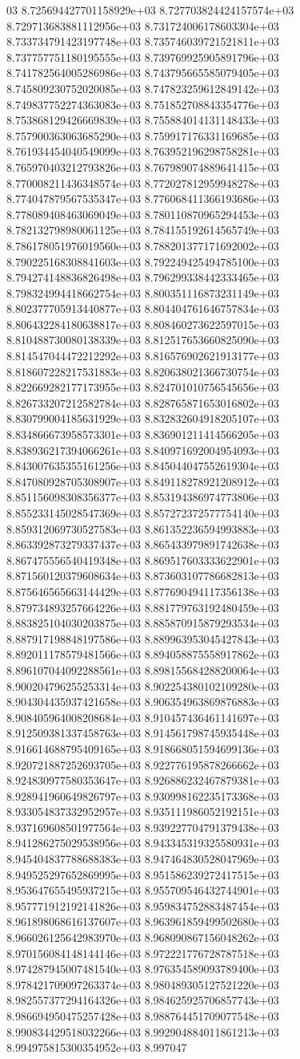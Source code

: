03	8.725694427701158929e+03	8.727703824424157574e+03	8.729713683881112956e+03	8.731724006178603304e+03	8.733734791423197748e+03	8.735746039721521811e+03	8.737757751180195555e+03	8.739769925905891796e+03	8.741782564005286986e+03	8.743795665585079405e+03	8.745809230752020085e+03	8.747823259612849142e+03	8.749837752274363083e+03	8.751852708843354776e+03	8.753868129426669839e+03	8.755884014131148433e+03	8.757900363063685290e+03	8.759917176331169685e+03	8.761934454040549099e+03	8.763952196298758281e+03	8.765970403212793826e+03	8.767989074889641415e+03	8.770008211436348574e+03	8.772027812959948278e+03	8.774047879567535347e+03	8.776068411366193686e+03	8.778089408463069049e+03	8.780110870965294453e+03	8.782132798980061125e+03	8.784155192614565749e+03	8.786178051976019560e+03	8.788201377171692002e+03	8.790225168308841603e+03	8.792249425494785100e+03	8.794274148836826498e+03	8.796299338442333465e+03	8.798324994418662754e+03	8.800351116873231149e+03	8.802377705913440877e+03	8.804404761646757834e+03	8.806432284180638817e+03	8.808460273622597015e+03	8.810488730080138339e+03	8.812517653660825090e+03	8.814547044472212292e+03	8.816576902621913177e+03	8.818607228217531883e+03	8.820638021366730754e+03	8.822669282177173955e+03	8.824701010756545656e+03	8.826733207212582784e+03	8.828765871653016802e+03	8.830799004185631929e+03	8.832832604918205107e+03	8.834866673958573301e+03	8.836901211414566205e+03	8.838936217394066261e+03	8.840971692004954093e+03	8.843007635355161256e+03	8.845044047552619304e+03	8.847080928705308907e+03	8.849118278921208912e+03	8.851156098308356377e+03	8.853194386974773806e+03	8.855233145028547369e+03	8.857272372577754140e+03	8.859312069730527583e+03	8.861352236594993883e+03	8.863392873279337437e+03	8.865433979891742638e+03	8.867475556540419348e+03	8.869517603333622901e+03	8.871560120379608634e+03	8.873603107786682813e+03	8.875646565663144429e+03	8.877690494117356138e+03	8.879734893257664226e+03	8.881779763192480459e+03	8.883825104030203875e+03	8.885870915879293534e+03	8.887917198848197586e+03	8.889963953045427843e+03	8.892011178579481566e+03	8.894058875558917862e+03	8.896107044092288561e+03	8.898155684288200064e+03	8.900204796255253314e+03	8.902254380102109280e+03	8.904304435937421658e+03	8.906354963869876883e+03	8.908405964008208684e+03	8.910457436461141697e+03	8.912509381337458763e+03	8.914561798745935448e+03	8.916614688795409165e+03	8.918668051594699136e+03	8.920721887252693705e+03	8.922776195878266662e+03	8.924830977580353647e+03	8.926886232467879381e+03	8.928941960649826797e+03	8.930998162235173368e+03	8.933054837332952957e+03	8.935111986052192151e+03	8.937169608501977564e+03	8.939227704791379438e+03	8.941286275029538956e+03	8.943345319325580931e+03	8.945404837788688383e+03	8.947464830528047969e+03	8.949525297652869995e+03	8.951586239272417515e+03	8.953647655495937215e+03	8.955709546432744901e+03	8.957771912192141826e+03	8.959834752883487454e+03	8.961898068616137607e+03	8.963961859499502680e+03	8.966026125642983970e+03	8.968090867156048262e+03	8.970156084148144146e+03	8.972221776728787518e+03	8.974287945007481540e+03	8.976354589093789400e+03	8.978421709097263374e+03	8.980489305127521220e+03	8.982557377294164326e+03	8.984625925706857743e+03	8.986694950475257428e+03	8.988764451709077548e+03	8.990834429518032266e+03	8.992904884011861213e+03	8.994975815300354952e+03	8.997047